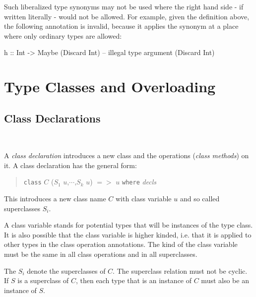 Such liberalized type synonyms may not be used where the right hand side - if written literally - would not be allowed. For example, given the definition above, the following annotation is invalid, because it applies the synonym at a place where only ordinary types are allowed:

\begin{code}
h :: Int -> Maybe (Discard Int)    -- illegal type argument (Discard Int)
\end{code}



\section{Type Classes and Overloading}
\subsection{Class Declarations} \label{classdcl}  

\begin{flushleft}
     \\
  
\end{flushleft}

A \emph{class declaration} introduces a new class and the operations (\emph{class methods}) on it. A class declaration has the general form:

\begin{quote}
\texttt{class} $C$ \hspace{0.2cm} ($S_1$ $u$,$\cdots$,$S_k$ $u$)  $=>$ $u$\hspace{0.2cm} \texttt{where} \hspace{0.2cm} \emph{decls}
\end{quote}

This introduces a new class name $C$ with class variable $u$ and so called superclasses $S_i$.

A class variable stands for potential types that will be instances of the type class. It is also possible that the class variable is higher kinded, i.e. that it is applied to other types in the class operation annotations. The kind of the class variable must be the same in all class operations and in all superclasses.

The $S_i$ denote the superclasses of $C$.
The superclass relation must not be cyclic. If $S$ is a superclass of $C$, then each type that is an instance of $C$ must also be an instance of $S$.

